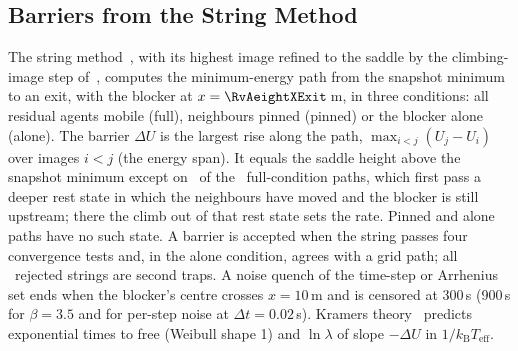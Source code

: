 \subsection{Barriers from the String Method}\label{sec:barrier}
The string method~\cite{e2007}, with its highest image refined to the saddle by the climbing-image step of~\cite{henkelman2000}, computes the minimum-energy path from the snapshot minimum to an exit, with the blocker at $x=\RvAeightXExit$\,m, in three conditions: all residual agents mobile (full), neighbours pinned (pinned) or the blocker alone (alone). The barrier $\Delta U$ is the largest rise along the path, $\max_{i<j}(U_j-U_i)$ over images $i<j$ (the energy span). It equals the saddle height above the snapshot minimum except on \RxSpanAffFull\ of the \RxSpanBarN\ full-condition paths, which first pass a deeper rest state in which the neighbours have moved and the blocker is still upstream; there the climb out of that rest state sets the rate. Pinned and alone paths have no such state. A barrier is accepted when the string passes four convergence tests and, in the alone condition, agrees with a grid path; all \RvAeightFailed\ rejected strings are second traps. A noise quench of the time-step or Arrhenius set ends when the blocker's centre crosses $x=10$\,m and is censored at 300\,s (900\,s for $\beta=3.5$ and for per-step noise at $\Delta t=0.02$\,s). Kramers theory~\cite{kramers1940,langer1969,hanggi1990} predicts exponential times to free (Weibull shape 1) and $\ln\lambda$ of slope $-\Delta U$ in $1/k_{\mathrm{B}}T_{\mathrm{eff}}$.

